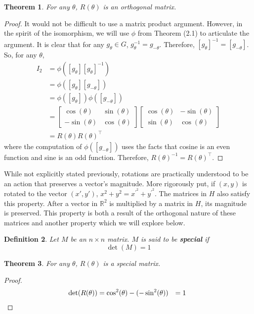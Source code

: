 \documentclass[10pt]{ucthesis}
\newcommand{\R}{\mathbb{R}}
\newtheorem{definition}{Definition}[chapter]
\newtheorem{theorem}[definition]{Theorem}
\begin{document}
\begin{theorem}
	For any $\theta$, $R(\theta)$ is an orthogonal matrix.
\end{theorem}
\noindent\begin{proof} It would not be difficult to use a matrix product argument. However, in the spirit of the isomorphism, we will use $\phi$ from Theorem (2.1) to articulate the argument. It is clear that for any $g_\theta \in G$, $g_\theta^{-1} = g_{-\theta}$. Therefore, $[g_\theta]^{-1} = [g_{-\theta}]$. So, for any $\theta$, 
\begin{equation}
	\begin{aligned}
		I_2 &= \phi([g_\theta][g_\theta]^{-1})\\
		 &= \phi([g_\theta][g_{-\theta}]) \\ 
		 &= \phi([g_\theta])\phi([g_{-\theta}])\\
		 &= \begin{bmatrix}
			\cos(\theta) & \sin(\theta) \\
			-\sin(\theta) & \cos(\theta)
		\end{bmatrix}
\begin{bmatrix}
			\cos(\theta) & -\sin(\theta) \\
			\sin(\theta) & \cos(\theta)
		\end{bmatrix}\\
		 &= R(\theta)R(\theta)^\intercal
	\end{aligned}
\end{equation}
where the computation of $\phi([g_{-\theta}])$ uses the facts that cosine is an even function and sine is an odd function. Therefore, $R(\theta)^{-1} = R(\theta)^\intercal$. \end{proof}

While not explicitly stated previously, rotations are practically understood to be an action that preserves a vector's magnitude. More rigorously put, if $(x,y)$ is rotated to the vector $(x',y')$, $x^2+y^2 = x^{\prime^2}+y^{\prime^2}$. The matrices in $H$ also satisfy this property. After a vector in $\R^2$ is multiplied by a matrix in $H$, its magnitude is preserved. This property is both a result of the orthogonal nature of these matrices and another property which we will explore below.

\begin{definition}
	Let $M$ be an $n\times n$ matrix. $M$ is said to be \textbf{special} if $$\det(M)=1$$
\end{definition}

\begin{theorem}
	For any $\theta$, $R(\theta)$ is a special matrix.
\end{theorem}
\noindent\begin{proof}
\begin{equation}
	\begin{aligned}
		\det(R(\theta)) &= \cos^2(\theta) - (-\sin^2(\theta)) &= 1 \hspace{1mm} 
	\end{aligned}
\end{equation}
\end{proof}
\end{document}
